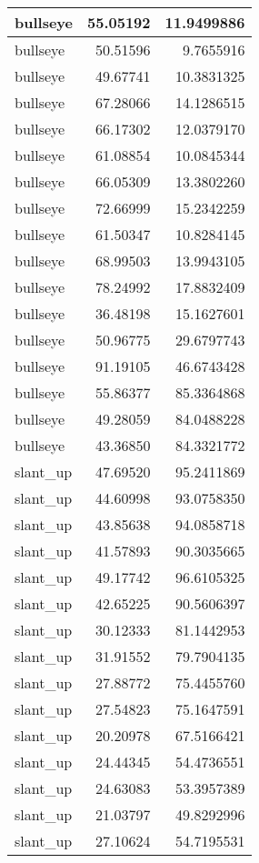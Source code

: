 \documentclass[
]{book}
\theoremstyle{definition}
\theoremstyle{definition}
\theoremstyle{definition}
\theoremstyle{definition}
\theoremstyle{remark}
\begin{document}
\begin{tabular}{l|r|r}
\hline
bullseye & 55.05192 & 11.9499886\\
\hline
bullseye & 50.51596 & 9.7655916\\
\hline
bullseye & 49.67741 & 10.3831325\\
\hline
bullseye & 67.28066 & 14.1286515\\
\hline
bullseye & 66.17302 & 12.0379170\\
\hline
bullseye & 61.08854 & 10.0845344\\
\hline
bullseye & 66.05309 & 13.3802260\\
\hline
bullseye & 72.66999 & 15.2342259\\
\hline
bullseye & 61.50347 & 10.8284145\\
\hline
bullseye & 68.99503 & 13.9943105\\
\hline
bullseye & 78.24992 & 17.8832409\\
\hline
bullseye & 36.48198 & 15.1627601\\
\hline
bullseye & 50.96775 & 29.6797743\\
\hline
bullseye & 91.19105 & 46.6743428\\
\hline
bullseye & 55.86377 & 85.3364868\\
\hline
bullseye & 49.28059 & 84.0488228\\
\hline
bullseye & 43.36850 & 84.3321772\\
\hline
slant\_up & 47.69520 & 95.2411869\\
\hline
slant\_up & 44.60998 & 93.0758350\\
\hline
slant\_up & 43.85638 & 94.0858718\\
\hline
slant\_up & 41.57893 & 90.3035665\\
\hline
slant\_up & 49.17742 & 96.6105325\\
\hline
slant\_up & 42.65225 & 90.5606397\\
\hline
slant\_up & 30.12333 & 81.1442953\\
\hline
slant\_up & 31.91552 & 79.7904135\\
\hline
slant\_up & 27.88772 & 75.4455760\\
\hline
slant\_up & 27.54823 & 75.1647591\\
\hline
slant\_up & 20.20978 & 67.5166421\\
\hline
slant\_up & 24.44345 & 54.4736551\\
\hline
slant\_up & 24.63083 & 53.3957389\\
\hline
slant\_up & 21.03797 & 49.8292996\\
\hline
slant\_up & 27.10624 & 54.7195531\\

\end{tabular}
\end{document}
